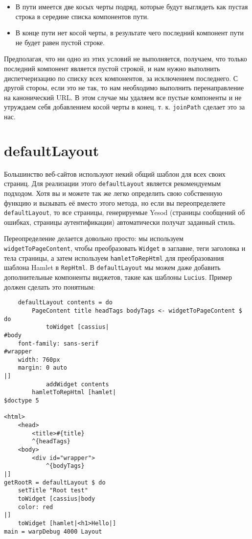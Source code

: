 \begin{itemize}
  \item В пути имеется две косых черты подряд, которые будут выглядеть как пустая строка в середине списка компонентов пути.
  \item В конце пути нет косой черты, в результате чего последний компонент пути не будет равен пустой строке.
\end{itemize}

Предполагая, что ни одно из этих условий не выполняется, получаем, что только последний компонент является пустой строкой, и нам нужно выполнить диспетчеризацию по списку всех компонентов, за исключением последнего. С другой стороы, если это не так, то нам необходимо выполнить перенаправление на канонический URL. В этом случае мы удаляем все пустые компоненты и не утруждаем себя добавлением косой черты в конец, т. к. \lstinline!joinPath! сделает это за нас.

\section {defaultLayout}

Большинство веб-сайтов используют некий общий шаблон для всех своих страниц. Для реализации этого \lstinline!defaultLayout! является рекомендуемым подходом. Хотя вы и можете так же легко определить свою собственную функцию и вызывать её вместо этого метода, но если вы переопределяете \lstinline!defaultLayout!, то все страницы, генерируемые Yesod (страницы сообщений об ошибках, страницы аутентификации) автоматически получат заданный стиль.

Переопределение делается довольно просто: мы используем \lstinline!widgetToPageContent!, чтобы преобразовать \lstinline!Widget! в заглавие, теги заголовка и тела страницы, а затем используем \lstinline!hamletToRepHtml! для преобразования шаблона Hamlet в \lstinline!RepHtml!. В \lstinline!defaultLayout! мы можем даже добавить дополнительные компоненты виджетов, такие как шаблоны \lstinline!Lucius!. Пример должен сделать это понятным:

\begin{lstlisting}
    defaultLayout contents = do
        PageContent title headTags bodyTags <- widgetToPageContent $ do
            toWidget [cassius|
#body
    font-family: sans-serif
#wrapper
    width: 760px
    margin: 0 auto
|]
            addWidget contents
        hamletToRepHtml [hamlet|
$doctype 5

<html>
    <head>
        <title>#{title}
        ^{headTags}
    <body>
        <div id="wrapper">
            ^{bodyTags}
|]
getRootR = defaultLayout $ do
    setTitle "Root test"
    toWidget [cassius|body
    color: red
|]
    toWidget [hamlet|<h1>Hello|]
main = warpDebug 4000 Layout
\end{lstlisting}%

